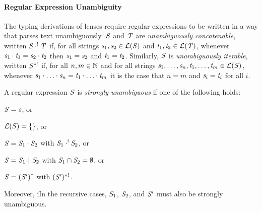 \documentclass[acmsmall]{acmart}
\begin{document}
\paragraph*{\iffull Regular Expression \fi Unambiguity}


The typing derivations of lenses require regular expressions to be written in a
way that parses text unambiguously. $\mathit{S}$ and $\mathit{T}$ are
\textit{unambiguously concatenable}, written
$\mathit{S}\cdot^!\mathit{T}$ if, 
for all strings $\mathit{s}_1,\mathit{s}_2\in\mathcal{L}(\mathit{S})$ and
$\mathit{t}_1,\mathit{t}_2\in\mathcal{L}(\mathit{T})$, whenever
$\mathit{s}_1\cdot\mathit{t}_1=\mathit{s}_2\cdot\mathit{t}_2$ then
$\mathit{s}_1=\mathit{s}_2$ and $\mathit{t}_1=\mathit{t}_2$.
%
Similarly, $\mathit{S}$ is \textit{unambiguously iterable},
written $\mathit{S}^{*!}$ if,
for all $n,m\in\mathbb{N}$ and for all strings
$\mathit{s}_1,\ldots,\mathit{s}_n,\mathit{t}_1,\ldots,\mathit{t}_m\in\mathcal{L}(\mathit{S})$,
whenever
$\mathit{s}_1\cdot\ldots\cdot\mathit{s}_n=\mathit{t}_1\cdot\ldots\cdot\mathit{t}_m$
it is the case that $n=m$ and $\mathit{s}_i=\mathit{t}_i$ for all $i$.

A regular expression $\mathit{S}$ is \textit{strongly unambiguous} if one
of the following holds: 
\begin{enumerate*}[label=(\alph*) ]
\item $\mathit{S} = \mathit{s}$,  or
\item $\mathcal{L}(\mathit{S}) = \{\}$, or 
\item $\mathit{S} = \mathit{S}_1 \cdot \mathit{S}_2$ with $\mathit{S}_1 \cdot^!
  \mathit{S}_2$, or
\item $\mathit{S} = \mathit{S}_1 ~|~ \mathit{S}_2$ with $\mathit{S}_1 \cap \mathit{S}_2 =
  \emptyset$, 
or
\item $\mathit{S} = {(\mathit{S}')}^*$ with $(\mathit{S}')^{*!}$.
\end{enumerate*}
\iffull Moreover, i\else I\fi{}n the recursive cases, $\mathit{S}_1$, $\mathit{S}_2$, and $\mathit{S}'$
must also be strongly unambiguous.
\end{document}
